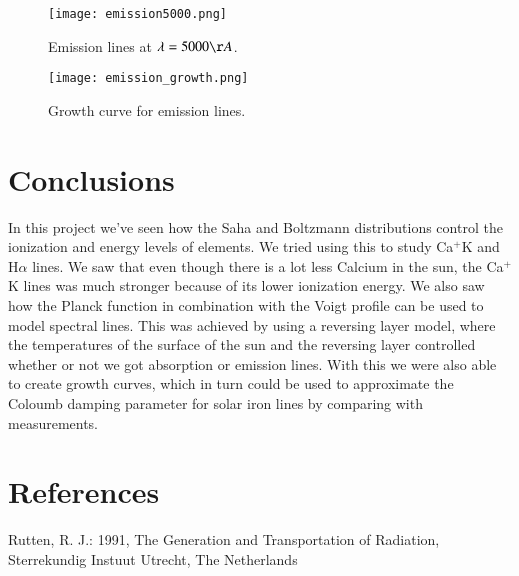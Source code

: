 \documentclass{aa}   %
\begin{document}
\begin{figure}
 \texttt{[image: emission5000.png]}
 \caption{Emission lines at $\lambda = 5000 \AA$.}
 \label{emission5000} 
\end{figure}
\begin{figure}
 \texttt{[image: emission\_growth.png]}
 \caption{Growth curve for emission lines.}
 \label{emission_growth} 
\end{figure}

\section{Conclusions} \label{sec:conclusions}
In this project we've seen how the Saha and Boltzmann distributions control the ionization and energy levels of elements. We tried using this to study Ca$^+$K and H$\alpha$ lines. We saw that even though there is a lot less Calcium in the sun, the Ca$^+$K lines was much stronger because of its lower ionization energy.
We also saw how the Planck function in combination with the Voigt profile can be used to model spectral lines. This was achieved by using a reversing layer model, where the temperatures of the surface of the sun and the reversing layer controlled whether or not we got absorption or emission lines. With this we were also able to create growth curves, which in turn could be used to approximate the Coloumb damping parameter for solar iron lines by comparing with measurements.

\section{References}
Rutten, R. J.: 1991, The Generation and Transportation of Radiation, Sterrekundig Instuut Utrecht, The Netherlands

\end{document}
